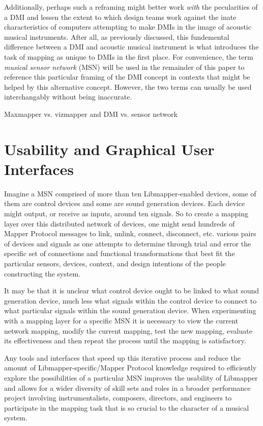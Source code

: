 Additionally, perhaps such a reframing might better work \emph{with} the pecularities of a DMI and lessen the extent to which design teams work against the inate characteristics of computers attempting to make DMIs in the image of acoustic musical instruments. After all, as previously discussed, this fundemental difference between a DMI and acoustic musical instrument is what introduces the task of mapping as unique to DMIs in the first place. For convenience, the term \emph{musical sensor network} (MSN) will be used in the remainder of this paper to reference this particular framing of the DMI concept in contexts that might be helped by this alternative concept. However, the two terms can usually be used interchangably without being inaccurate. 

Maxmapper vs. vizmapper and DMI vs. sensor network

\section{Usability and Graphical User Interfaces}

Imagine a MSN comprised of more than ten Libmapper-enabled devices, some of them are control devices and some are sound generation devices. Each device might output, or receive as inputs, around ten signals. So to create a mapping layer over this distributed network of devices, one might send hundreds of Mapper Protocol messages to link, unlink, connect, disconnect, etc. various pairs of devices and signals as one attempts to determine through trial and error the specific set of connections and functional transformations that best fit the particular sensors, devices, context, and design intentions of the people constructing the system. 

It may be that it is unclear what control device ought to be linked to what sound generation device, much less what signals within the control device to connect to what particular signals within the sound generation device. When experimenting with a mapping layer for a specific MSN it is necessary to view the current network mapping, modify the current mapping, test the new mapping, evaluate its effectiveness and then repeat the process until the mapping is satisfactory. 

Any tools and interfaces that speed up this iterative process and reduce the amount of Libmapper-specific/Mapper Protocol knowledge required to efficiently explore the possibilities of a particular MSN improves the usability of Libmapper and allows for a wider diversity of skill sets and roles in a broader performance project involving instrumentalists, composers, directors, and engineers to participate in the mapping task that is so crucial to the character of a musical system. 

